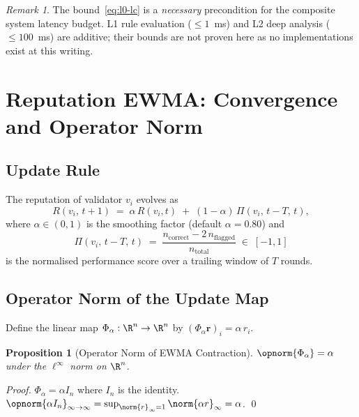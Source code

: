 \documentclass[12pt,a4paper]{article}
\newtheorem{proposition}[theorem]{Proposition}
\theoremstyle{definition}
\theoremstyle{remark}
\newtheorem{remark}[theorem]{Remark}
\begin{document}
\begin{remark}
The bound~\eqref{eq:l0-lc} is a \emph{necessary} precondition for the composite
system latency budget.  L1 rule evaluation ($\le 1$~ms) and L2 deep analysis
($\le 100$~ms) are additive; their bounds are not proven here as no implementations
exist at this writing.
\end{remark}

\section{Reputation EWMA: Convergence and Operator Norm}
\label{sec:ewma}

\subsection{Update Rule}

The reputation of validator $v_i$ evolves as
\begin{equation}
  R(v_i,\,t+1)
  \;=\; \alpha\,R(v_i,t) \;+\; (1-\alpha)\,\Pi(v_i,\,t-T,\,t),
  \label{eq:ewma}
\end{equation}
where $\alpha \in (0,1)$ is the smoothing factor (default $\alpha=0.80$) and
\begin{equation}
  \Pi(v_i,\,t-T,\,t)
  \;=\; \frac{n_{\text{correct}} - 2\,n_{\text{flagged}}}{n_{\text{total}}}
  \;\in\; [-1,1]
  \label{eq:perf}
\end{equation}
is the normalised performance score over a trailing window of $T$ rounds.

\subsection{Operator Norm of the Update Map}

Define the linear map $\Phi_\alpha:\R^n\to\R^n$ by $(\Phi_\alpha \mathbf{r})_i =
\alpha\, r_i$.

\begin{proposition}[Operator Norm of EWMA Contraction]
\label{prop:ewma-opnorm}
$\opnorm{\Phi_\alpha} = \alpha$ under the $\ell^\infty$ norm on $\R^n$.
\end{proposition}

\begin{proof}
$\Phi_\alpha = \alpha I_n$ where $I_n$ is the identity.
$\opnorm{\alpha I_n}_{\infty\to\infty} = \sup_{\norm{r}_\infty=1}
\norm{\alpha r}_\infty = \alpha$. \qed
\end{proof}
\end{document}
